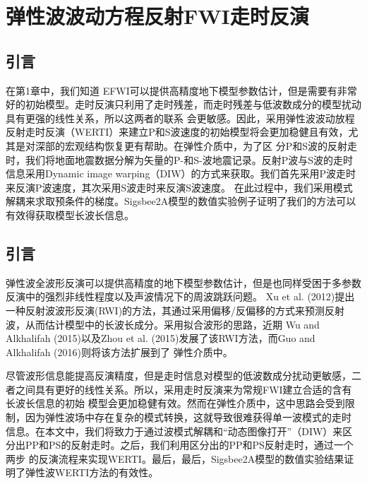 



\chapter{弹性波波动方程反射FWI走时反演}

\section{引言}
在第1章中，我们知道
EFWI可以提供高精度地下模型参数估计，但是需要有非常好的初始模型。走时反演只利用了走时残差，而走时残差与低波数成分的模型扰动具有更强的线性关系，所以这两者的联系
会更敏感。因此，采用弹性波波动放程反射走时反演（WERTI）来建立P和S波速度的初始模型将会更加稳健且有效，尤其是对深部的宏观结构恢复更有帮助。在弹性介质中，为了区
分P和S波的反射走时，我们将地面地震数据分解为矢量的P-和S-波地震记录。反射P波与S波的走时信息采用Dynamic
image
warping（DIW）的方式来获取。我们首先采用P波走时来反演P波速度，其次采用S波走时来反演S波速度。
在此过程中，我们采用模式解耦来求取预条件的梯度。Sigsbee2A模型的数值实验例子证明了我们的方法可以有效得获取模型长波长信息。

\section{引言}
弹性波全波形反演可以提供高精度的地下模型参数估计，但是也同样受困于多参数反演中的强烈非线性程度以及声波情况下的周波跳跃问题\cite[]{sears:2008,brossier2009}。
Xu et al. (2012)\cite{xu:2012}提出一种反射波波形反演(RWI)的方法，其通过采用偏移/反偏移的方式来预测反射波，从而估计模型中的长波长成分。采用拟合波形的思路，近期
Wu and Alkhalifah (2015)\cite[]{Wu2015b}以及Zhou et al. (2015)\cite[]{Zhou2015}发展了该RWI方法，而Guo and Alkhalifah (2016)\cite{Guo2016}则将该方法扩展到了
弹性介质中。

尽管波形信息能提高反演精度，但是走时信息对模型的低波数成分扰动更敏感，二者之间具有更好的线性关系。所以，采用走时反演来为常规FWI建立合适的含有长波长信息的初始
模型会更加稳健有效\cite[]{Ma2013, Chi2015, Luo2016}。然而在弹性介质中，这中思路会受到限制，因为弹性波场中存在复杂的模式转换，这就导致很难获得单一波模式的走时
信息。在本文中，我们将致力于通过波模式解耦和“动态图像打开”（DIW）\cite[]{Ma2013}来区分出PP和PS的反射走时。之后，我们利用区分出的PP和PS反射走时，通过一个两步
的反演流程来实现WERTI\cite[]{Hale2013}。最后，最后，Sigsbee2A模型的数值实验结果证明了弹性波WERTI方法的有效性。
